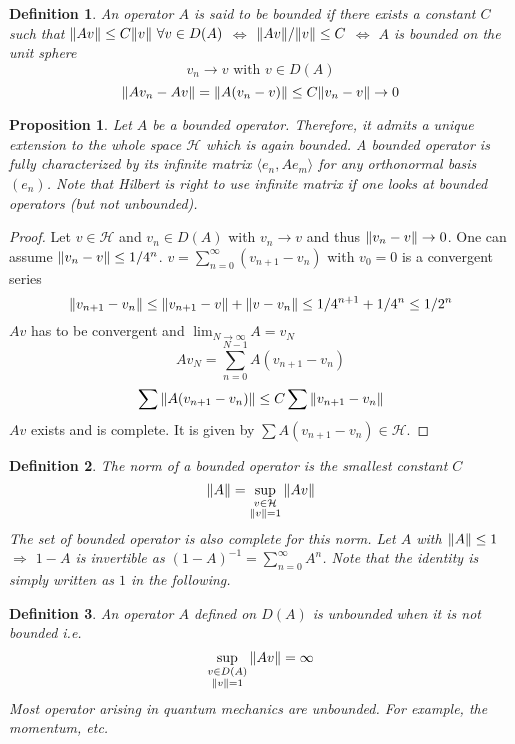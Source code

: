 \documentclass{article}
\newtheorem*{definition}{Definition}
\newtheorem*{proposition}{Proposition}
\newcommand{\cH}{\mathcal{H}}
\renewcommand{\sp}[2]{\langle #1,#2 \rangle}
\begin{document}
\begin{definition} 
  An operator $A$ is said to be bounded if there exists a constant $C$ such that 
  $ \norm{A v} \le C \norm{v} \ \forall v \in D(A)$ $\Leftrightarrow$ $\norm{A v}/\norm{v} \le C$ $\Leftrightarrow$ $A$ is bounded on the unit sphere 
  $$ v_n \to v \text{ with } v \in D(A) $$
  $$\norm{A v_n - A v} = \norm{A(v_n - v)} \le C \norm{v_n -v} \to  0 $$
\end{definition} 

\begin{proposition} 
  Let $A$ be a bounded operator. 
  Therefore, it admits a unique extension to the whole space $\cH$ which is again bounded.
  A bounded operator is fully characterized by its infinite matrix $\sp{e_n}{A e_m}$ for any orthonormal basis $(e_n)$.
  Note that Hilbert is right to use infinite matrix if one looks at bounded operators (but not unbounded).
\end{proposition} 

\begin{proof} 
  Let $v \in \cH$ and $v_n \in D(A)$ with $v_n \to v$ and thus $\norm{v_n - v} \to 0$.
  One can assume $\norm{v_n - v} \le 1/4^n$.
  $v = \sum_{n=0}^\infty (v_{n+1} - v_n)$ with $v_0 = 0$ is a convergent series
  $$\norm{v_{n+1} - v_n} \le \norm{v_{n+1} - v} + \norm{v - v_n} \le 1/4^{n+1} + 1/4^n \le 1/2^n$$
  $Av$ has to be convergent and $\lim_{N\to\infty} A = v_N$
  $$A v_N = \sum_{n=0}^{N-1} A(v_{n+1} - v_n)$$
  $$ \sum \norm{A(v_{n+1} - v_n)} \le C \sum \norm{v_{n+1} - v_n} $$
  $Av$ exists and is complete. 
  It is given by $\sum A (v_{n+1} - v_n) \in \cH$.
\end{proof} 

\begin{definition} 
  The norm of a bounded operator is the smallest constant $C$
  $$ \norm{A} = \sup_{\substack{v \in \cH \\ \norm{v}=1}} \norm{Av} $$
  The set of bounded operator is also complete for this norm.
  Let $A$ with $\norm{A} \le 1$ $\Rightarrow$ $1 - A$ is invertible as $(1 - A)^{-1} = \sum_{n=0}^\infty A^n$.
  Note that the identity is simply written as $1$ in the following.
\end{definition} 

\begin{definition} 
  An operator $A$ defined on $D(A)$ is unbounded when it is not bounded i.e. 
  $$\sup_{\substack{v \in D(A) \\ \norm{v} = 1}} \norm{Av} = \infty$$
  Most operator arising in quantum mechanics are unbounded. 
  For example, the momentum, etc.
\end{definition} 
\end{document}

